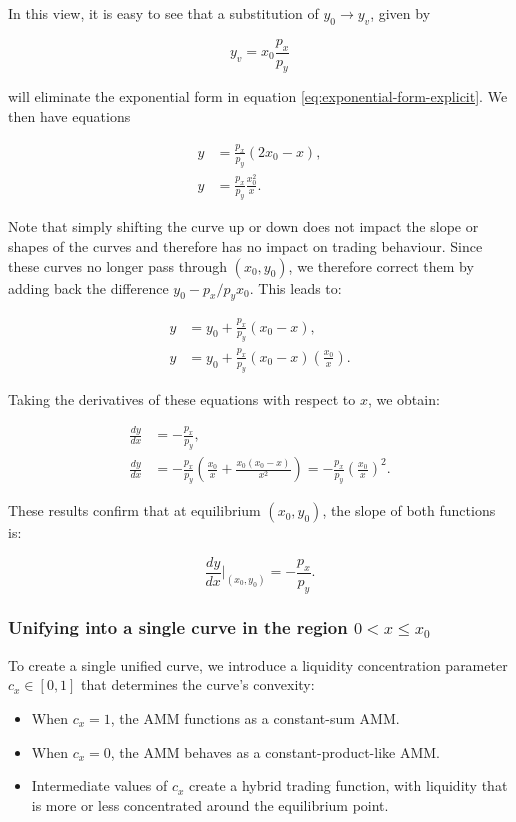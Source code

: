 \documentclass{article}
\begin{document}
In this view, it is easy to see that a substitution of $y_0 \rightarrow y_v$, given by

\[
y_v = x_0 \frac{p_x}{p_y}
\]

will eliminate the exponential form in equation \eqref{eq:exponential-form-explicit}. We then have equations

\begin{align}
    y &= \frac{p_x}{p_y} (2x_0 - x), \\
    y &= \frac{p_x}{p_y} \frac{x_0^2}{x}.
\end{align}

Note that simply shifting the curve up or down does not impact the slope or shapes of the curves and therefore has no impact on trading behaviour. Since these curves no longer pass through \( (x_0, y_0) \), we therefore correct them by adding back the difference \( y_0 - p_x / p_y x_0 \). This leads to:

\begin{align}
    y &= y_0 + \frac{p_x}{p_y} (x_0 - x), \\
    y &= y_0 + \frac{p_x}{p_y} (x_0 - x) \left( \frac{x_0}{x} \right).
\end{align}

Taking the derivatives of these equations with respect to $x$, we obtain:

\begin{align}
    \frac{dy}{dx} &= -\frac{p_x}{p_y}, \\
    \frac{dy}{dx} &= -\frac{p_x}{p_y} \left( \frac{x_0}{x} + \frac{x_0(x_0 - x)}{x^2} \right)
    = -\frac{p_x}{p_y} \left( \frac{x_0}{x} \right)^2.
\end{align}

These results confirm that at equilibrium $(x_0, y_0)$, the slope of both functions is:

\[
\frac{dy}{dx} \Big|_{(x_0, y_0)} = -\frac{p_x}{p_y}.
\]

\subsubsection{Unifying into a single curve in the region $0 < x \leq x_0$}

To create a single unified curve, we introduce a liquidity concentration parameter \( c_x \in [0, 1] \) that determines the curve’s convexity:

\begin{itemize}
    \item When \( c_x = 1 \), the AMM functions as a constant-sum AMM.
    \item When \( c_x = 0 \), the AMM behaves as a constant-product-like AMM.
    \item Intermediate values of \( c_x \) create a hybrid trading function, with liquidity that is more or less concentrated around the equilibrium point.
\end{itemize}
\end{document}
